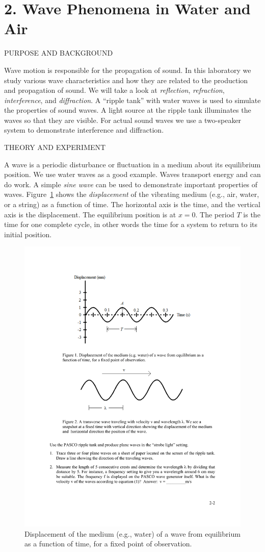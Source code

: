 \documentclass[11pt]{NSF}
\begin{document}
     
\section{2. Wave Phenomena in Water and Air}

PURPOSE AND BACKGROUND

Wave motion is responsible for the propagation of sound. In this laboratory we
study various wave characteristics and how they are related to the production
and propagation of sound. We will take a look at {\em reflection}, 
{\em refraction}, {\em interference}, and {\em diffraction}. 
A ``ripple tank” with water waves is used to
simulate the properties of sound waves. A light source at the ripple tank
illuminates the waves so that they are visible. For actual sound waves we use a
two-speaker system to demonstrate interference and diffraction.

THEORY AND EXPERIMENT

A wave is a periodic disturbance or fluctuation in a medium about its
equilibrium position. We use water waves as a good example. Waves transport
energy and can do work. A simple {\em sine wave} 
can be used to demonstrate important properties of waves. 
Figure~\ref{f:1} shows the {\em displacement} of the vibrating medium
(e.g., air, water, or a string) as a function of time. The horizontal axis is
the time, and the vertical axis is the displacement. The equilibrium position
is at $x=0$. The period $T$ is the time for one complete cycle, in other words the
time for a system to return to its initial position.
%
\begin{figure}[hbtp]
\begin{center}
\includegraphics[width=.6\textwidth]{fig2_1}
\caption{Displacement of the medium (e.g., water) of a wave from equilibrium 
as a function of time, for a fixed point of observation.}
\label{f:1}
\end{center}
\end{figure}
%
\end{document}
